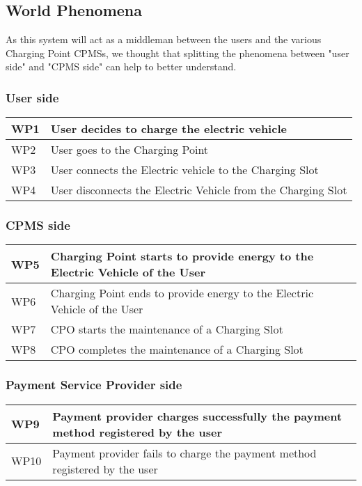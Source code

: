 \subsection{World Phenomena}
As this system will act as a middleman between the users and the various Charging Point CPMSs, we thought that splitting the phenomena between "user side" and "CPMS side" can help to better understand.

\subsubsection{User side}
\begin{tabular}{|l|l|}
	\hline
	WP1 & User decides to charge the electric vehicle\\
	\hline
	WP2 & User goes to the Charging Point\\
	\hline
	WP3 & User connects the Electric vehicle to the Charging Slot\\
	\hline
	WP4 & User disconnects the Electric Vehicle from the Charging Slot\\
	\hline
\end{tabular}

\subsubsection{CPMS side}
\begin{tabular}{|l|l|}
	\hline
	WP5 & Charging Point starts to provide energy to the Electric Vehicle of the User\\
	\hline
	WP6 & Charging Point ends to provide energy to the Electric Vehicle of the User\\
	\hline
	WP7 & CPO starts the maintenance of a Charging Slot\\
	\hline
	WP8 & CPO completes the maintenance of a Charging Slot\\
	\hline
\end{tabular}

\subsubsection{Payment Service Provider side}
\begin{tabular}{|l|l|}
	\hline
	WP9 & Payment provider charges successfully the payment method registered by the user\\
	\hline
	WP10 & Payment provider fails to charge the payment method registered by the user\\
	\hline
\end{tabular}\\\\

